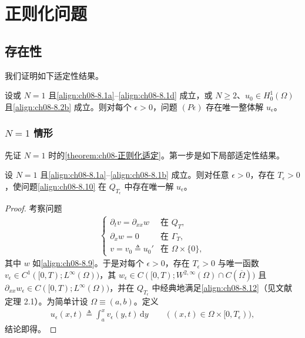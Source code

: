 \documentclass[../../main.tex]{subfiles}%
\begin{document}
\section{正则化问题}\label{section:ch08-正则化问题}

\subsection{存在性}\label{subsection:ch08-存在性}

我们证明如下适定性结果。

\begin{theorem}\label{theorem:ch08-正则化适定}
设或 $N=1$ 且\eqref{align:ch08-8.1a}--\eqref{align:ch08-8.1d} 成立，或 $N\geqslant2$、$u_0\in H^1_0(\Omega)$ 且\eqref{align:ch08-8.2b} 成立。则对每个 $\epsilon>0$，问题 $(P\epsilon)$ 存在唯一整体解 $u_\epsilon$。
\end{theorem}

\subsubsection{$N=1$ 情形}\label{subsubsection:ch08-N1存在}

先证 $N=1$ 时的\cref{theorem:ch08-正则化适定}。第一步是如下局部适定性结果。

\begin{lemma}[局部适定性]\label{lemma:ch08-局部适定N1}
设 $N=1$ 且\eqref{align:ch08-8.1a}--\eqref{align:ch08-8.1b} 成立。则对任意 $\epsilon>0$，存在 $T_\epsilon>0$，使问题\eqref{align:ch08-8.10} 在 $Q_{T_\epsilon}$ 中存在唯一解 $u_\epsilon$。
\end{lemma}

\begin{proof}
考察问题
\begin{align}
\begin{cases}
\partial_t v=\partial_{xx}w & \text{在 }Q_T,\\
\partial_x w=0 & \text{在 }\Gamma_T,\\
v=v_0\triangleq u_0' & \text{在 }\Omega\times\{0\},
\end{cases} \label{align:ch08-8.12}
\end{align}
其中 $w$ 如\eqref{align:ch08-8.9}。于是对每个 $\epsilon>0$，存在 $T_\epsilon>0$ 与唯一函数 $v_\epsilon\in C^1([0,T);L^\infty(\Omega))$，其 $w_\epsilon\in C([0,T);W^{2,\infty}(\Omega)\cap C(\overline\Omega))$ 且 $\partial_{xx}w_\epsilon\in C([0,T);L^\infty(\Omega))$，并在 $Q_{T_\epsilon}$ 中经典地满足\eqref{align:ch08-8.12}（见文献~\cite{ref74} 定理 2.1）。为简单计设 $\Omega\equiv(a,b)$。定义
\begin{align}
u_\epsilon(x,t)\triangleq \int_a^x v_\epsilon(y,t)\,\mathrm{d}y\qquad((x,t)\in\Omega\times[0,T_\epsilon)), \label{align:ch08-8.13}
\end{align}
结论即得。
\end{proof}
\end{document}
